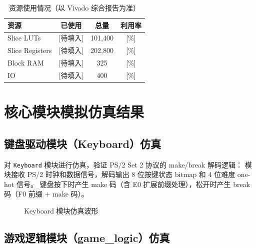 \documentclass[12pt,a4paper]{ctexart}
\begin{document}
\begin{table}[H]
\centering
\caption{资源使用情况（以 Vivado 综合报告为准）}
\label{tab:util}
\begin{tabular}{lccc}
\toprule
\textbf{资源} & \textbf{已使用} & \textbf{总量} & \textbf{利用率} \\
\midrule
Slice LUTs      & {[待填入]} & 101,400 & {[\%]} \\
Slice Registers & {[待填入]} & 202,800 & {[\%]} \\
Block RAM       & {[待填入]} & 325 & {[\%]} \\
IO              & {[待填入]} & 400 & {[\%]} \\
\bottomrule
\end{tabular}
\end{table}



\section{核心模块模拟仿真结果}

\subsection{键盘驱动模块（Keyboard）仿真}

对 \texttt{Keyboard} 模块进行仿真，验证 PS/2 Set 2 协议的 make/break 解码逻辑：
模块接收 PS/2 时钟和数据信号，解码输出 8 位按键状态 bitmap 和 4 位难度 one-hot 信号。
键盘按下时产生 make 码（含 E0 扩展前缀处理），松开时产生 break 码（F0 前缀 + make 码）。

\begin{figure}[H]
\centering
\caption{Keyboard 模块仿真波形}
\label{fig:sim_keyboard}
\end{figure}

\subsection{游戏逻辑模块（game\_logic）仿真}
\end{document}
